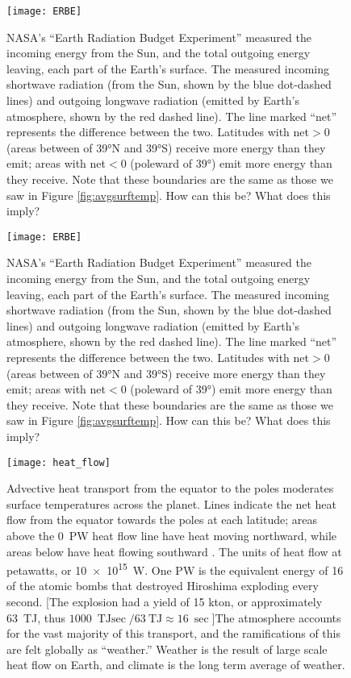 \documentclass[amstex,12pt]{book}
\begin{document}
\begin{figure}[p]
\centering
\texttt{[image: ERBE]}%
\caption{NASA's ``Earth Radiation Budget Experiment'' measured the incoming energy from the Sun, and the total outgoing energy leaving, each part of the Earth's surface. The measured incoming shortwave radiation (from the Sun, shown by the blue dot-dashed lines) and outgoing longwave radiation (emitted by Earth’s atmosphere, shown by the red dashed line). The line marked ``net'' represents the difference between the two. Latitudes with net$>0$(areas between of \ang{39}N and \ang{39}S) receive more energy than they emit; areas with net$<0$ (poleward of \ang{39}) emit more energy than they receive. Note that these boundaries are the same as those we saw in Figure \ref{fig:avgsurftemp}. How can this be? What does this imply? }   
\label{fig:erbe}
\end{figure}

\begin{figure}[p]
\centering
\texttt{[image: ERBE]}%
\caption{NASA's ``Earth Radiation Budget Experiment'' measured the incoming energy from the Sun, and the total outgoing energy leaving, each part of the Earth's surface. The measured incoming shortwave radiation (from the Sun, shown by the blue dot-dashed lines) and outgoing longwave radiation (emitted by Earth’s atmosphere, shown by the red dashed line). The line marked ``net'' represents the difference between the two. Latitudes with net$>0$(areas between of \ang{39}N and \ang{39}S) receive more energy than they emit; areas with net$<0$ (poleward of \ang{39}) emit more energy than they receive. Note that these boundaries are the same as those we saw in Figure \ref{fig:avgsurftemp}. How can this be? What does this imply? }   
\label{fig:erbe}
\end{figure}


\begin{figure}[p]
\centering
\texttt{[image: heat\_flow]}%
\caption{Advective heat transport from the equator to the poles moderates surface temperatures across the planet. Lines indicate the net heat flow from the equator towards the poles at each latitude; areas above the \SI{0}{\peta\watt} heat flow line have heat moving northward, while areas below have heat flowing southward . The units of heat flow at petawatts, or \SI{10e15}{\watt}. One \si{\peta\watt} is the equivalent energy of 16 of the atomic bombs that destroyed Hiroshima exploding every second. [The explosion had a yield of 15 kton, or approximately \SI{63}{\tera\joule}, thus $\SI{1000}{\tera\joule\sec}/\SI{63}{\tera\joule}\approx \SI{16}{\sec}$]The atmosphere accounts for the vast majority of this transport, and the ramifications of this are felt globally as ``weather.'' Weather is the result of large scale heat flow on Earth, and climate is the long term average of weather.}   
\label{fig:heatflow}
\end{figure}
\end{document}

